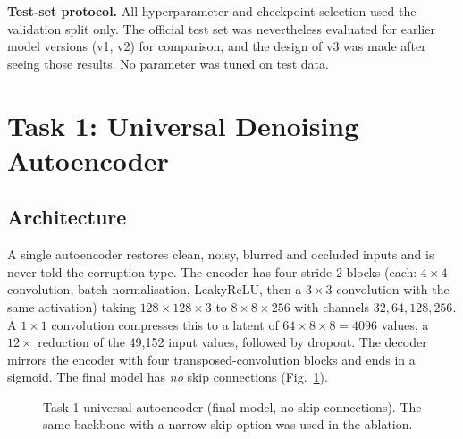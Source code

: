 \documentclass[conference]{IEEEtran}
\begin{document}
\textbf{Test-set protocol.} All hyperparameter and checkpoint selection used the validation split only. The official test set was nevertheless evaluated for earlier model versions (v1, v2) for comparison, and the design of v3 was made after seeing those results. No parameter was tuned on test data.

\section{Task 1: Universal Denoising Autoencoder}
\subsection{Architecture}
A single autoencoder restores clean, noisy, blurred and occluded inputs and is never told the corruption type. The encoder has four stride-2 blocks (each: $4{\times}4$ convolution, batch normalisation, LeakyReLU, then a $3{\times}3$ convolution with the same activation) taking $128{\times}128{\times}3$ to $8{\times}8{\times}256$ with channels $32,64,128,256$. A $1{\times}1$ convolution compresses this to a latent of $64{\times}8{\times}8=4096$ values, a $12\times$ reduction of the 49{,}152 input values, followed by dropout. The decoder mirrors the encoder with four transposed-convolution blocks and ends in a sigmoid. The final model has \emph{no} skip connections (Fig.~\ref{fig:ae}).

\begin{figure}[t]
\centering
{}
\caption{Task 1 universal autoencoder (final model, no skip connections). The same backbone with a narrow skip option was used in the ablation.}\label{fig:ae}
\end{figure}
\end{document}
